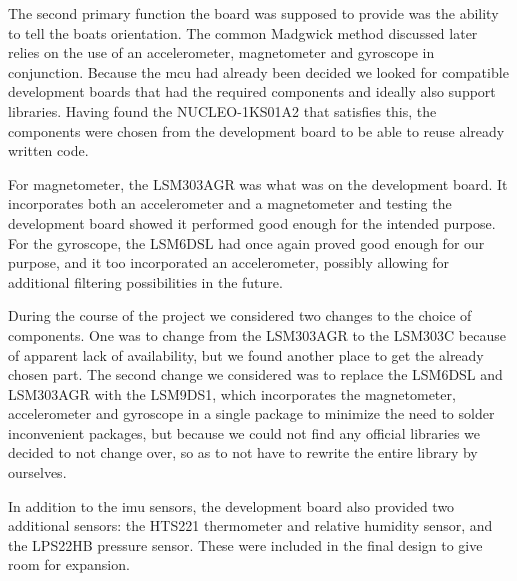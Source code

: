 The second primary function the board was supposed to provide was the ability to tell the boats orientation. The common Madgwick method discussed later relies on the use of an accelerometer, magnetometer and gyroscope in conjunction. Because the \gls{mcu} had already been decided we looked for compatible development boards that had the required components and ideally also support libraries. Having found the NUCLEO-1KS01A2 that satisfies this, the components were chosen from the development board to be able to reuse already written code. 

For magnetometer, the LSM303AGR was what was on the development board. It incorporates both an accelerometer and a magnetometer and testing the development board showed it performed good enough for the intended purpose. For the gyroscope, the LSM6DSL had once again proved good enough for our purpose, and it too incorporated an accelerometer, possibly allowing for additional filtering possibilities in the future. 

During the course of the project we considered two changes to the choice of components. One was to change from the LSM303AGR to the LSM303C because of apparent lack of availability, but we found another place to get the already chosen part. The second change we considered was to replace the LSM6DSL and LSM303AGR with the LSM9DS1, which incorporates the magnetometer, accelerometer and gyroscope in a single package to minimize the need to solder inconvenient packages, but because we could not find any official libraries we decided to not change over, so as to not have to rewrite the entire library by ourselves. 

In addition to the \gls{imu} sensors, the development board also provided two additional sensors: the HTS221 thermometer and relative humidity sensor, and the LPS22HB pressure sensor. These were included in the final design to give room for expansion. 

